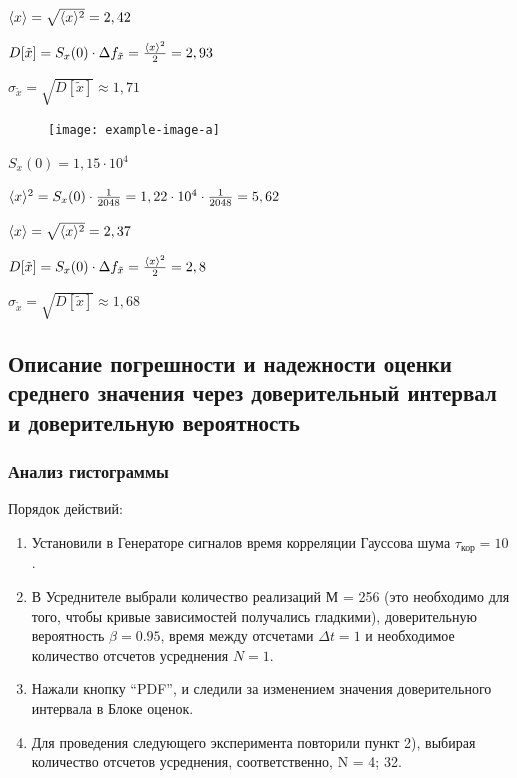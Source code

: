 $\langle x\rangle =  \sqrt{\langle x\rangle^2} = 2,42$

$D[\tilde{x}] = S_x(0)\cdot \Delta f_{\tilde{x}} =\frac{\langle x\rangle^2}{2} = 2,93$

$\sigma_{\tilde{x}} = \sqrt{D[\tilde{x}]}\approx 1,71$
\begin{figure}[H]
	\centering
	\texttt{[image: example-image-a]}

\end{figure}

$S_x(0)=1,15\cdot 10^4$

$\langle x\rangle^2 = S_x(0)\cdot \frac{1}{2048}= 1,22\cdot 10^4\cdot \frac{1}{2048} = 5,62$

$\langle x\rangle =  \sqrt{\langle x\rangle^2} = 2,37$

$D[\tilde{x}] = S_x(0)\cdot \Delta f_{\tilde{x}} =\frac{\langle x\rangle^2}{2} = 2,8$

$\sigma_{\tilde{x}} = \sqrt{D[\tilde{x}]}\approx 1,68$

\subsection[Задание 6]{Описание погрешности и надежности оценки среднего значения через доверительный интервал и доверительную вероятность}
\subsubsection[Задание 6.1]{Анализ гистограммы}
Порядок действий:
\begin{enumerate}
	\item Установили в Генераторе сигналов время корреляции Гауссова шума $\tau_\text{кор}=10$.
	\item В Усреднителе выбрали количество реализаций М = 256 (это необходимо для того, чтобы кривые зависимостей получались гладкими), доверительную вероятность $\beta = 0.95$, время между отсчетами $\Delta t = 1$ и необходимое количество отсчетов усреднения $N=1$.
	\item Нажали кнопку “PDF”, и следили за изменением значения доверительного интервала в Блоке оценок.
	\item Для проведения следующего эксперимента повторили пункт 2), выбирая количество отсчетов усреднения, соответственно, N = 4; 32.
\end{enumerate}

